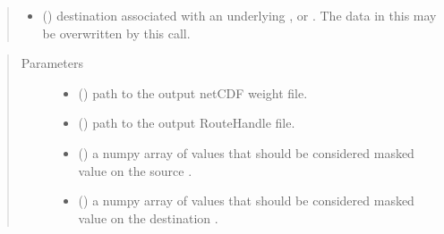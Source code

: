 \documentclass[letterpaper,10pt,english]{sphinxmanual}
\begin{document}
\begin{fulllineitems}
\begin{quote}
\begin{description}
\begin{itemize}
\item {} 
 ({\hyperref[\detokenize{field:ESMF.api.field.Field}]{}}) \textendash{} destination {\hyperref[\detokenize{field:ESMF.api.field.Field}]{}} associated with an underlying
{\hyperref[\detokenize{grid:ESMF.api.grid.Grid}]{}}, {\hyperref[\detokenize{mesh:ESMF.api.mesh.Mesh}]{}} or {\hyperref[\detokenize{locstream:ESMF.api.locstream.LocStream}]{}}.  The data in this {\hyperref[\detokenize{field:ESMF.api.field.Field}]{}} may be overwritten
by this call.

\end{itemize}

\end{description}\end{quote}

\begin{quote}\begin{description}
\item[{Parameters}] \leavevmode\begin{itemize}
\item {} 
 () \textendash{} path to the output netCDF weight file.

\item {} 
 () \textendash{} path to the output RouteHandle file.

\item {} 
 () \textendash{} a numpy array of values that should be
considered masked value on the source {\hyperref[\detokenize{field:ESMF.api.field.Field}]{}}.

\item {} 
 () \textendash{} a numpy array of values that should be
considered masked value on the destination {\hyperref[\detokenize{field:ESMF.api.field.Field}]{}}.


\end{itemize}
\end{description}
\end{quote}
\end{fulllineitems}
\end{document}

